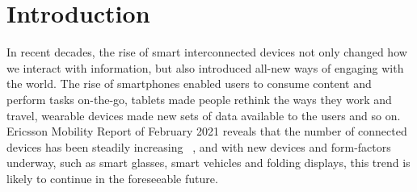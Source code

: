 
\chapter{Introduction} \label{introduction}

In recent decades, the rise of smart interconnected devices not only changed how we interact with information, but also introduced all-new ways of engaging with the world. The rise of smartphones enabled users to consume content and perform tasks on-the-go, tablets made people rethink the ways they work and travel, wearable devices made new sets of data available to the users and so on. Ericsson Mobility Report of February 2021 reveals that the number of connected devices has been steadily increasing ~\cite{EricssonMobility2020}, and with new devices and form-factors underway, such as smart glasses, smart vehicles and folding displays, this trend is likely to continue in the foreseeable future. 

